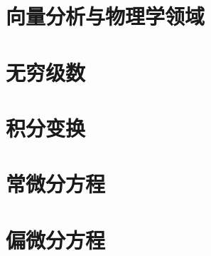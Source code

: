 \chapter{向量分析与物理学领域}











\chapter{无穷级数}






\chapter{积分变换}



\chapter{常微分方程}









\chapter{偏微分方程}





